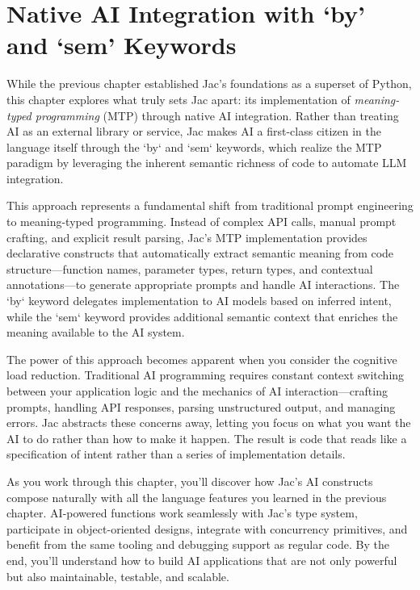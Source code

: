 \chapter{Native AI Integration with `by' and `sem' Keywords}

While the previous chapter established Jac's foundations as a superset of Python, this chapter explores what truly sets Jac apart: its implementation of \emph{meaning-typed programming} (MTP) through native AI integration. Rather than treating AI as an external library or service, Jac makes AI a first-class citizen in the language itself through the `by` and `sem` keywords, which realize the MTP paradigm by leveraging the inherent semantic richness of code to automate LLM integration.

This approach represents a fundamental shift from traditional prompt engineering to meaning-typed programming. Instead of complex API calls, manual prompt crafting, and explicit result parsing, Jac's MTP implementation provides declarative constructs that automatically extract semantic meaning from code structure—function names, parameter types, return types, and contextual annotations—to generate appropriate prompts and handle AI interactions. The `by` keyword delegates implementation to AI models based on inferred intent, while the `sem` keyword provides additional semantic context that enriches the meaning available to the AI system.

The power of this approach becomes apparent when you consider the cognitive load reduction. Traditional AI programming requires constant context switching between your application logic and the mechanics of AI interaction—crafting prompts, handling API responses, parsing unstructured output, and managing errors. Jac abstracts these concerns away, letting you focus on what you want the AI to do rather than how to make it happen. The result is code that reads like a specification of intent rather than a series of implementation details.

As you work through this chapter, you'll discover how Jac's AI constructs compose naturally with all the language features you learned in the previous chapter. AI-powered functions work seamlessly with Jac's type system, participate in object-oriented designs, integrate with concurrency primitives, and benefit from the same tooling and debugging support as regular code. By the end, you'll understand how to build AI applications that are not only powerful but also maintainable, testable, and scalable.

